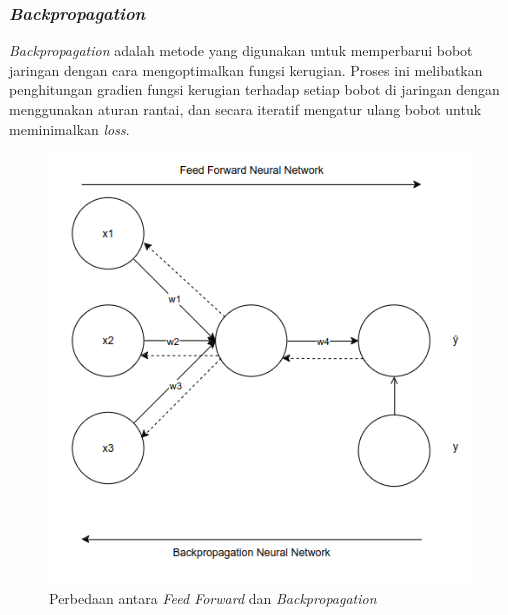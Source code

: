  \subsubsection{\emph{Backpropagation}}
 \emph{Backpropagation} adalah metode yang digunakan untuk memperbarui bobot jaringan dengan cara mengoptimalkan fungsi kerugian. Proses ini melibatkan penghitungan gradien fungsi kerugian terhadap setiap bobot di jaringan dengan menggunakan aturan rantai, dan secara iteratif mengatur ulang bobot untuk meminimalkan \emph{loss}.
 
\begin{figure}[H]
  \centering
  \includegraphics[scale=0.6]{gambar/bab2-ff-backprop.png}
  \caption{Perbedaan antara \emph{Feed Forward} dan \emph{Backpropagation}}
  \label{fig:ff_backprop}
\end{figure}

